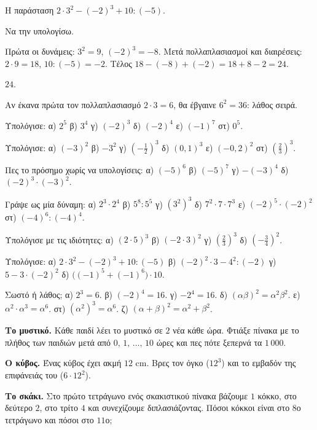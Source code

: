 \tixero Η παράσταση $2\cdot3^2-(-2)^3+10:(-5)$.\par
\tithelo Να την υπολογίσω.\par
\possindeo Πρώτα οι δυνάμεις: $3^2=9$, $(-2)^3=-8$. Μετά πολλαπλασιασμοί και διαιρέσεις: $2\cdot9=18$, $10:(-5)=-2$. Τέλος $18-(-8)+(-2)=18+8-2=24$.\par
\apantisi $24$.\par
\elegxos Αν έκανα πρώτα τον πολλαπλασιασμό $2\cdot3=6$, θα έβγαινε $6^2=36$: λάθος σειρά.



\ex Υπολόγισε: α) $2^5$ \quad β) $3^4$ \quad γ) $(-2)^3$ \quad δ) $(-2)^4$ \quad ε) $(-1)^7$ \quad στ) $0^5$.

\ex Υπολόγισε: α) $(-3)^2$ \quad β) $-3^2$ \quad γ) $\left(-\frac{1}{2}\right)^3$ \quad δ) $(0{,}1)^3$ \quad ε) $(-0{,}2)^2$ \quad στ) $\left(\frac{2}{3}\right)^3$.

\ex Πες το πρόσημο χωρίς να υπολογίσεις: α) $(-5)^6$ \quad β) $(-5)^7$ \quad γ) $-(-3)^4$ \quad δ) $(-2)^3\cdot(-3)^2$.

\ex Γράψε ως μία δύναμη: α) $2^3\cdot2^4$ \quad β) $5^8:5^5$ \quad γ) $(3^2)^3$ \quad δ) $7^2\cdot7\cdot7^3$ \quad ε) $(-2)^5\cdot(-2)^2$ \quad στ) $(-4)^6:(-4)^4$.

\ex Υπολόγισε με τις ιδιότητες: α) $(2\cdot5)^3$ \quad β) $(-2\cdot3)^2$ \quad γ) $\left(\frac{2}{3}\right)^3$ \quad δ) $\left(-\frac{3}{4}\right)^2$.

\ex Υπολόγισε: α) $2\cdot3^2-(-2)^3+10:(-5)$ \quad β) $(-2)^2\cdot3-4^2:(-2)$ \quad γ) $5-3\cdot(-2)^2$ \quad δ) $\big((-1)^5+(-1)^6\big)\cdot10$.

\ex Σωστό ή λάθος; α) $2^3=6$. \quad β) $(-2)^4=16$. \quad γ) $-2^4=16$. \quad δ) $(\alpha\beta)^2=\alpha^2\beta^2$. \quad ε) $\alpha^2\cdot\alpha^3=\alpha^6$. \quad στ) $(\alpha^2)^3=\alpha^6$. \quad ζ) $(\alpha+\beta)^2=\alpha^2+\beta^2$.


\ex \textbf{Το μυστικό.} Κάθε παιδί λέει το μυστικό σε $2$ νέα κάθε ώρα. Φτιάξε πίνακα με το πλήθος των παιδιών μετά από $0,\,1,\,\dots,\,10$ ώρες και πες πότε ξεπερνά τα $1\,000$.

\ex \textbf{Ο κύβος.} Ένας κύβος έχει ακμή $12$ cm. Βρες τον όγκο ($12^3$) και το εμβαδόν της επιφάνειάς του ($6\cdot12^2$).

\ex \textbf{Το σκάκι.} Στο πρώτο τετράγωνο ενός σκακιστικού πίνακα βάζουμε $1$ κόκκο, στο δεύτερο $2$, στο τρίτο $4$ και συνεχίζουμε διπλασιάζοντας. Πόσοι κόκκοι είναι στο $8$ο τετράγωνο και πόσοι στο $11$ο;


